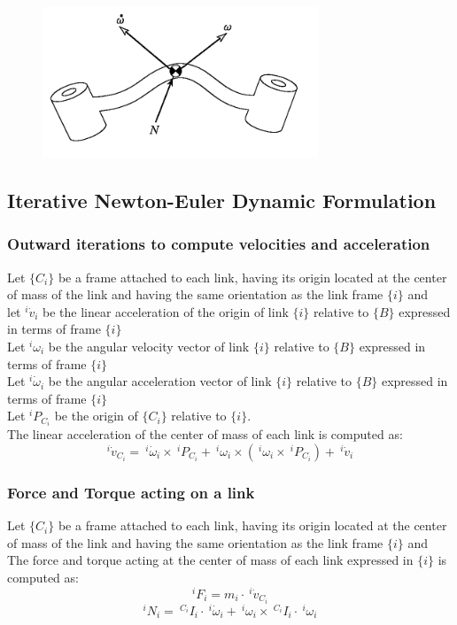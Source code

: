 \documentclass[10pt,a4paper]{article}
\begin{document}
\begin{figure}[H]
	\includegraphics[width=0.5\columnwidth]{imgs/link_euler.png}
\end{figure}

\subsection{Iterative Newton-Euler Dynamic Formulation}
\subsubsection{Outward iterations to compute velocities and acceleration}
Let $\{C_i\}$ be a frame attached to each link, having its origin located at the center of mass of the link and having the same orientation as the link frame $\{i\}$ and \\
let $^i\dot v_i$ be the linear acceleration of the origin of link $\{i\}$ relative to $\{B\}$ expressed in terms of frame $\{i\}$ \\
Let $^i\omega_i$ be the angular velocity vector of link $\{i\}$ relative to $\{B\}$ expressed in terms of frame $\{i\}$ \\
Let $^i\dot \omega_i$ be the angular acceleration vector of link $\{i\}$ relative to $\{B\}$ expressed in terms of frame $\{i\}$ \\
Let $^iP_{C_i}$ be the origin of $\{C_i\}$ relative to $\{i\}$. \\
The linear acceleration of the center of mass of each link is computed as:
$$
	^i\dot v_{C_i} = ~^i \dot \omega_i \times ~^iP_{C_i} + ~^i \omega_i \times (~^i \omega_i \times ~^iP_{C_i}) + ~^i \dot v_i
$$

\subsubsection{Force and Torque acting on a link}
Let $\{C_i\}$ be a frame attached to each link, having its origin located at the center of mass of the link and having the same orientation as the link frame $\{i\}$ and \\
The force and torque acting at the center of mass of each link expressed in $\{i\}$ is computed as:
$$
	^iF_i = m_i ⋅ ~^i\dot v_{C_i}
$$
$$
	^iN_i = ~^{C_i}I_i ⋅ ~^i\dot \omega_i + ~^i\omega_i \times ~^{C_i}I_i ⋅ ~^i\omega_i
$$
\end{document}
